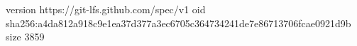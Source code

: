 version https://git-lfs.github.com/spec/v1
oid sha256:a4da812a918c9e1ea37d377a3ec6705c364734241de7e86713706fcae0921d9b
size 3859
